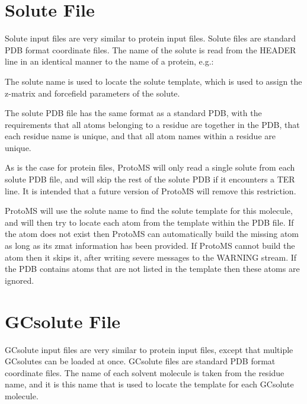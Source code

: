 \documentclass[letterpaper,10pt,english]{sphinxmanual}
\begin{document}
\section{Solute File}
\label{\detokenize{protoms:solute-file}}\label{\detokenize{protoms:solpdb}}
Solute input files are very similar to protein input files. Solute files are standard PDB format coordinate files. The name of the solute is read from the HEADER line in an identical manner to the name of a protein, e.g.:

%
\begin{sphinxVerbatim}[commandchars=\\\{\}]
 
\end{sphinxVerbatim}

The solute name is used to locate the solute template, which is used to assign the z-matrix and forcefield parameters of the solute.

The solute PDB file has the same format as a standard PDB, with the requirements that all atoms belonging to a residue are together in the PDB, that each residue name is unique, and that all atom names within a residue are unique.

As is the case for protein files, ProtoMS will only read a single solute from each solute PDB file, and will skip the rest of the solute PDB if it encounters a TER line. It is intended that a future version of ProtoMS will remove this restriction.

ProtoMS will use the solute name to find the solute template for this molecule, and will then try to locate each atom from the template within the PDB file. If the atom does not exist then ProtoMS can automatically build the missing atom as long as its zmat information has been provided. If ProtoMS cannot build the atom then it skips it, after writing severe messages to the WARNING stream. If the PDB contains atoms that are not listed in the template then these atoms are ignored.


\section{GCsolute File}
\label{\detokenize{protoms:gcsolute-file}}\label{\detokenize{protoms:gcpdb}}
GCsolute input files are very similar to protein input files, except that multiple GCsolutes can be loaded at once. GCsolute files are standard PDB format coordinate files. The name of each solvent molecule is taken from the residue name, and it is this name that is used to locate the template for each GCsolute molecule.
\end{document}
